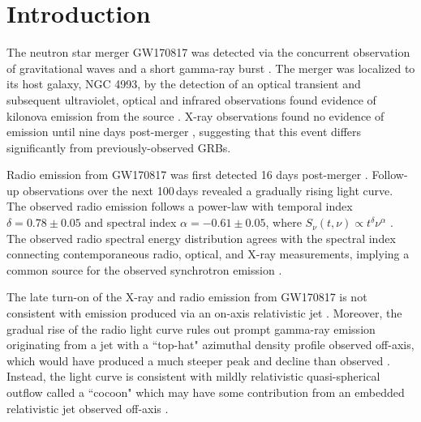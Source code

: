 \section{Introduction}\label{sec:intro}
The neutron star merger GW170817 was detected via the concurrent observation of gravitational waves \citep{2017PhRvL.119p1101A} and a short gamma-ray burst \citep[GRB;][]{2017ApJ...848L..13A,2017ApJ...848L..14G}. The merger was localized to its host galaxy, NGC 4993, by the detection of an optical transient \citep{2017Natur.551...64A,2017ApJ...848L..12A,2017Sci...358.1556C,2017ApJ...850L...1L,2017ApJ...848L..16S,2017ApJ...848L..27T,2017ApJ...848L..24V} and subsequent ultraviolet, optical and infrared observations found evidence of kilonova emission from the source \citep{2017Natur.551...64A,2017ApJ...848L..17C,2017Sci...358.1570D,2017Sci...358.1565E,2017Sci...358.1559K}. X-ray observations found no evidence of emission until nine days post-merger \citep{2017ApJ...848L..25H,2017Sci...358.1565E,2017ApJ...848L..20M,2017Natur.551...71T}, suggesting that this event differs significantly from previously-observed GRBs.


Radio emission from GW170817 was first detected 16 days post-merger \citep{2017Sci...358.1579H}. Follow-up observations over the next 100\,days \citep{2017ApJ...848L..21A,2018ApJ...856L..18M,2018Natur.554..207M,2018MNRAS.478L..18T} revealed a gradually rising light curve. The observed radio emission follows a power-law with temporal index $\delta=0.78\pm 0.05$ and spectral index $\alpha=-0.61\pm 0.05$, where $S_\nu(t,\nu) \propto t^\delta \nu^\alpha$ \citep{2018Natur.554..207M}. The observed radio spectral energy distribution agrees with the spectral index connecting contemporaneous radio, optical, and X-ray measurements, implying a common source for the observed synchrotron emission \citep{GCN22207,GCN22211,2018ApJ...856L..18M,2018Natur.554..207M,2018ATel11245....1T}. 


The late turn-on of the X-ray and radio emission from GW170817 is not consistent with emission produced via an on-axis relativistic jet \citep{2017ApJ...848L..21A,2017ApJ...848L..25H,2017Sci...358.1579H,2017ApJ...848L..20M,2017Natur.551...71T}. Moreover, the gradual rise of the radio light curve rules out prompt gamma-ray emission originating from a jet with a ``top-hat" azimuthal density profile observed off-axis, which would have produced a much steeper peak and decline than observed \citep{2002ApJ...570L..61G,2002ApJ...579..699N}. Instead, the light curve is consistent with mildly relativistic quasi-spherical outflow called a ``cocoon" \citep{2017Sci...358.1579H,2018MNRAS.473..576G,2018Natur.554..207M,2018MNRAS.478..407N} which may have some contribution from an embedded relativistic jet observed off-axis \citep[some versions of which are also referred to as a ``structured jet";][]{2018PhRvL.120x1103L,2018A&A...613L...1D,2018ApJ...856L..18M,2018ApJ...867...57R}.


